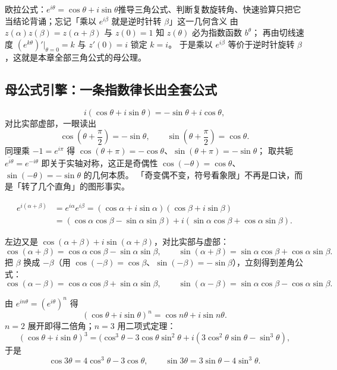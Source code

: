 \begin{explore}
\begin{conccard}[一级]{欧拉公式：$e^{i\theta}=\cos\theta+i\sin\theta$}{推导三角公式、判断复数旋转角、快速验算}{只把它当结论背诵；忘记「乘以 $e^{i\beta}$ 就是逆时针转 $\beta$」这一几何含义}
由 $z(\alpha)z(\beta)=z(\alpha+\beta)$ 与 $z(0)=1$ 知 $z(\theta)$ 必为指数函数 $b^\theta$；
再由切线速度 $(e^{k\theta})'\big|_{\theta=0}=k$ 与 $z'(0)=i$ 锁定 $k=i$。
于是乘以 $e^{i\beta}$ 等价于逆时针旋转 $\beta$，这就是本章全部三角公式的母公理。
\end{conccard}

\subsection{母公式引擎：一条指数律长出全套公式}


\[
  i(\cos\theta+i\sin\theta)=-\sin\theta+i\cos\theta,
\]
对比实部虚部，一眼读出
\[
  \cos\left(\theta+\frac{\pi}{2}\right)=-\sin\theta,\qquad
  \sin\left(\theta+\frac{\pi}{2}\right)=\cos\theta.
\]
同理乘 $-1=e^{i\pi}$ 得 $\cos(\theta+\pi)=-\cos\theta$、$\sin(\theta+\pi)=-\sin\theta$；
取共轭 $\overline{e^{i\theta}}=e^{-i\theta}$ 即关于实轴对称，这正是奇偶性
$\cos(-\theta)=\cos\theta$、$\sin(-\theta)=-\sin\theta$ 的几何本质。
「奇变偶不变，符号看象限」不再是口诀，而是「转了几个直角」的图形事实。

\begin{derivation}
\begin{align*}
  e^{i(\alpha+\beta)}&=e^{i\alpha}e^{i\beta}
  =(\cos\alpha+i\sin\alpha)(\cos\beta+i\sin\beta)\\
  &=(\cos\alpha\cos\beta-\sin\alpha\sin\beta)
  +i(\sin\alpha\cos\beta+\cos\alpha\sin\beta).
\end{align*}
\end{derivation}
左边又是 $\cos(\alpha+\beta)+i\sin(\alpha+\beta)$，对比实部与虚部：
\[
  \cos(\alpha+\beta)=\cos\alpha\cos\beta-\sin\alpha\sin\beta,\qquad
  \sin(\alpha+\beta)=\sin\alpha\cos\beta+\cos\alpha\sin\beta.
\]
把 $\beta$ 换成 $-\beta$（用 $\cos(-\beta)=\cos\beta$、$\sin(-\beta)=-\sin\beta$），立刻得到差角公式：
\[
  \cos(\alpha-\beta)=\cos\alpha\cos\beta+\sin\alpha\sin\beta,\qquad
  \sin(\alpha-\beta)=\sin\alpha\cos\beta-\cos\alpha\sin\beta.
\]

由 $e^{in\theta}=(e^{i\theta})^n$ 得
\[
  (\cos\theta+i\sin\theta)^n=\cos n\theta+i\sin n\theta.
\]
$n=2$ 展开即得二倍角；$n=3$ 用二项式定理：
\[
  (\cos\theta+i\sin\theta)^3
  =(\cos^3\theta-3\cos\theta\sin^2\theta
  +i(3\cos^2\theta\sin\theta-\sin^3\theta),
\]
于是
\[
  \cos3\theta=4\cos^3\theta-3\cos\theta,\qquad
  \sin3\theta=3\sin\theta-4\sin^3\theta.
\]


\end{explore}
